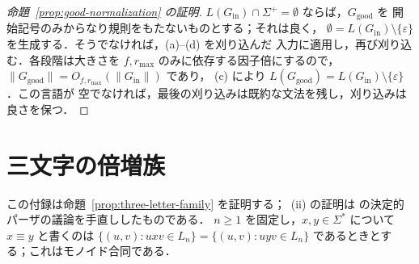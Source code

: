\documentclass[11pt,a4paper]{ltjsarticle}
\numberwithin{equation}{section}
\theoremstyle{plain}
\theoremstyle{definition}
\theoremstyle{remark}
\newcommand{\eps}{\varepsilon}
\theoremstyle{plain}
\begin{document}
\begin{proof}[命題~\ref{prop:good-normalization} の証明]
$L(G_{\mathrm{in}})\cap\Sigma^+=\emptyset$ ならば，$G_{\mathrm{good}}$ を
開始記号のみからなり規則をもたないものとする；それは良く，
$\emptyset=L(G_{\mathrm{in}})\setminus\{\eps\}$ を生成する．そうでなければ，(a)--(d) を刈り込んだ
入力に適用し，再び刈り込む．各段階は大きさを
$f,r_{\max}$ のみに依存する因子倍にするので，
$\|G_{\mathrm{good}}\|=O_{f,r_{\max}}(\|G_{\mathrm{in}}\|)$ であり，
(c) により $L(G_{\mathrm{good}})=L(G_{\mathrm{in}})\setminus\{\eps\}$．この言語が
空でなければ，最後の刈り込みは既約な文法を残し，刈り込みは良さを保つ．
\end{proof}


\section{三文字の倍増族}
\label{app:bracketed-family}
\label{app:three-letter-family}

この付録は命題~\ref{prop:three-letter-family} を証明する；~(ii) の証明は
\cite[Appendix~C]{kuriyamaCFG} の決定的パーザの議論を手直ししたものである．
$n\ge1$ を固定し，$x,y\in\Sigma^*$ について $x\equiv y$ と書くのは
$\{(u,v):uxv\in L_n\}=\{(u,v):uyv\in L_n\}$ であるときとする；これはモノイド合同である．
\end{document}
